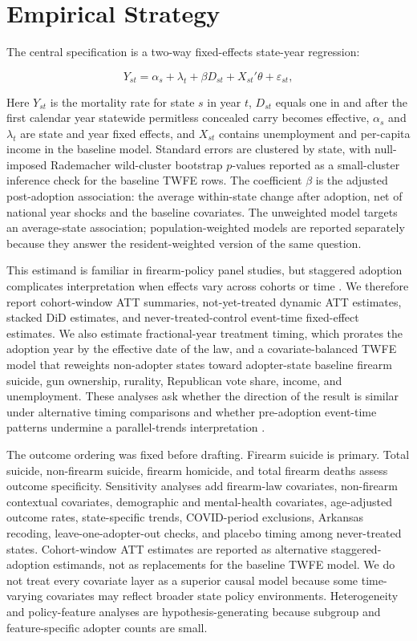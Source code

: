 \documentclass[11pt]{article}
\begin{document}
\section*{Empirical Strategy}

The central specification is a two-way fixed-effects state-year regression:

\[
Y_{st} = \alpha_s + \lambda_t + \beta D_{st} + X_{st}'\theta + \varepsilon_{st},
\]

Here $Y_{st}$ is the mortality rate for state $s$ in year $t$, $D_{st}$ equals one in and after the first calendar year statewide permitless concealed carry becomes effective, $\alpha_s$ and $\lambda_t$ are state and year fixed effects, and $X_{st}$ contains unemployment and per-capita income in the baseline model. Standard errors are clustered by state, with null-imposed Rademacher wild-cluster bootstrap $p$-values reported as a small-cluster inference check for the baseline TWFE rows. The coefficient $\beta$ is the adjusted post-adoption association: the average within-state change after adoption, net of national year shocks and the baseline covariates. The unweighted model targets an average-state association; population-weighted models are reported separately because they answer the resident-weighted version of the same question.

This estimand is familiar in firearm-policy panel studies, but staggered adoption complicates interpretation when effects vary across cohorts or time \citep{goodmanBacon2021,deChaisemartin2020,callawaySantanna2021,sunAbraham2021}. We therefore report cohort-window ATT summaries, not-yet-treated dynamic ATT estimates, stacked DiD estimates, and never-treated-control event-time fixed-effect estimates. We also estimate fractional-year treatment timing, which prorates the adoption year by the effective date of the law, and a covariate-balanced TWFE model that reweights non-adopter states toward adopter-state baseline firearm suicide, gun ownership, rurality, Republican vote share, income, and unemployment. These analyses ask whether the direction of the result is similar under alternative timing comparisons and whether pre-adoption event-time patterns undermine a parallel-trends interpretation \citep{roth2022}.

The outcome ordering was fixed before drafting. Firearm suicide is primary. Total suicide, non-firearm suicide, firearm homicide, and total firearm deaths assess outcome specificity. Sensitivity analyses add firearm-law covariates, non-firearm contextual covariates, demographic and mental-health covariates, age-adjusted outcome rates, state-specific trends, COVID-period exclusions, Arkansas recoding, leave-one-adopter-out checks, and placebo timing among never-treated states. Cohort-window ATT estimates are reported as alternative staggered-adoption estimands, not as replacements for the baseline TWFE model. We do not treat every covariate layer as a superior causal model because some time-varying covariates may reflect broader state policy environments. Heterogeneity and policy-feature analyses are hypothesis-generating because subgroup and feature-specific adopter counts are small.
\end{document}
